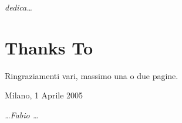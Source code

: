 \begin{flushright}
\Large\textit{dedica\dots}
\end{flushright}


\cleardoublepage

\thispagestyle{empty}

\chapter*{Thanks To}
Ringraziamenti vari, massimo una o due pagine.

\begin{flushleft}
Milano, 1 Aprile 2005
\end{flushleft}

\begin{flushright}
\emph{\dots Fabio \dots}
\end{flushright}

\cleardoublepage
\thispagestyle{empty}